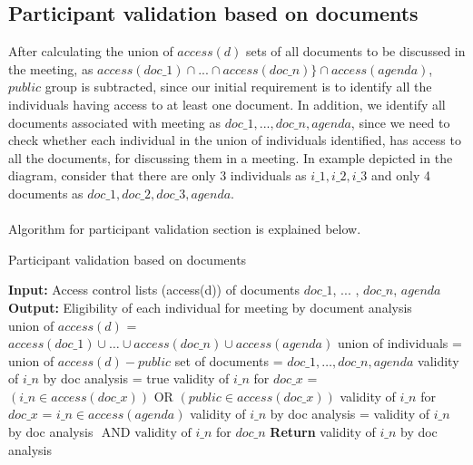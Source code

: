 \documentclass{article}
\begin{document}
\subsection{Participant validation based on documents}
After calculating the union of $access(d)$ sets of all documents to be discussed in the meeting, as $access(doc\_1) \cap ... \cap access(doc\_n)\} \cap access(agenda)$, $public$ group is subtracted, since our initial requirement is to identify all the individuals having access to at least one document. In addition, we identify all documents associated with meeting as $doc\_1, ..., doc\_n, agenda$, since we need to check whether each individual in the union of individuals identified, has access to all the documents, for discussing them in a meeting. In example depicted in the diagram, consider that there are only 3 individuals as $i\_1, i\_2, i\_3$ and only 4 documents as $doc\_1, doc\_2, doc\_3, agenda$.\\ \\
Algorithm for participant validation section is explained below.
\begin{algorithm}[H]
    \caption{Participant validation based on documents}
    \begin{algorithmic}
        \State \textbf{Input:} Access control lists (access(d)) of documents \(doc\_1\), ... , \(doc\_n\), \(agenda\)
        \State \textbf{Output:} Eligibility of each individual for meeting by document analysis \\
        \State union of \(access(d)\) = \(access(doc\_1) \cup \dots \cup access(doc\_n) \cup access(agenda)\)
        \State union of individuals = union of \(access(d) - public \)
        \State set of documents = \(doc\_1, \dots , doc\_n , agenda\)
            \State validity of \(i\_n\) by doc analysis = true
                    \State validity of \(i\_n\) for \(doc\_x\) = \((i\_n \in access(doc\_x)) \text{ OR } (public \in access(doc\_x))\)
                \Else
                    \State validity of \(i\_n\) for \(doc\_x\) = \(i\_n \in access(agenda)\)
                \EndIf
                \State validity of \(i\_n\) by doc analysis = validity of  \(i\_n\) by doc analysis \(\text{ AND validity of } i\_n\) for \(doc\_n\)
            \EndFor
            \State \textbf{Return} validity of \(i\_n\) by doc analysis
        \EndFor
    \end{algorithmic}
\end{algorithm}
\end{document}
